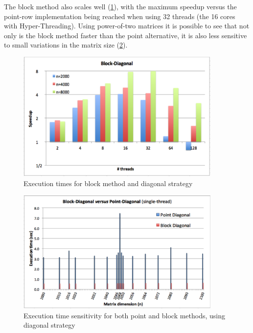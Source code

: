 \documentclass[../thesis]{subfiles}
\begin{document}
	The block method also scales well (\cref{fig:multicore:block:diagonal:speedup}), with the maximum speedup versus the point-row implementation being reached when using 32 threads (the 16 cores with Hyper-Threading). Using power-of-two matrices it is possible to see that not only is the block method faster than the point alternative, it is also less sensitive to small variations in the matrix size (\cref{fig:multicore:sensitivity}).

	\begin{figure}[hp]
		\begin{center}
			\includegraphics[width=0.9\textwidth]{assets/images/multicore/block-diagonal.png}
		\end{center}
		\caption{Execution times for block method and diagonal strategy}
		\label{fig:multicore:block:diagonal:speedup}
	\end{figure}

	\begin{figure}[hp]
		\begin{center}
			\includegraphics[width=0.9\textwidth]{assets/images/multicore/matrix-variations.png}
		\end{center}
		\caption{Execution time sensitivity for both point and block methods, using diagonal strategy}
		\label{fig:multicore:sensitivity}
	\end{figure}
\end{document}
